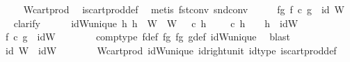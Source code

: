 \begin{isabellebody}
\ \ \ \ \isamarkupfalse%
\ W{\isacharprime}{\kern0pt}{\isacharunderscore}{\kern0pt}cart{\isacharunderscore}{\kern0pt}prod\ \isamarkupfalse%
\ is{\isacharunderscore}{\kern0pt}cart{\isacharunderscore}{\kern0pt}prod{\isacharunderscore}{\kern0pt}def\ \isamarkupfalse%
\ {\isacharparenleft}{\kern0pt}metis\ fst{\isacharunderscore}{\kern0pt}conv\ snd{\isacharunderscore}{\kern0pt}conv{\isacharparenright}{\kern0pt}\isanewline
\ \ \isamarkupfalse%
\ \isamarkupfalse%
\ fg{\isacharcolon}{\kern0pt}\ {\isachardoublequoteopen}f\ {\isasymcirc}\isactrlsub c\ g\ {\isacharequal}{\kern0pt}\ id\ W{\isacharprime}{\kern0pt}{\isachardoublequoteclose}\isanewline
\ \ \isamarkupfalse%
\ clarify\isanewline
\ \ \ \ \isamarkupfalse%
\ idW{\isacharprime}{\kern0pt}{\isacharunderscore}{\kern0pt}unique{\isacharcolon}{\kern0pt}\ {\isachardoublequoteopen}{\isasymforall}h{}{\isachardot}{\kern0pt}\ h{}\ {\isacharcolon}{\kern0pt}\ W{\isacharprime}{\kern0pt}\ {\isasymrightarrow}\ W{\isacharprime}{\kern0pt}\ {\isasymand}\ {\isasympi}{\isacharprime}{\kern0pt}\ {\isasymcirc}\isactrlsub c\ h{}\ {\isacharequal}{\kern0pt}\ {\isasympi}{\isacharprime}{\kern0pt}\ {\isasymand}\ {\isasympi}{\isacharprime}{\kern0pt}\ {\isasymcirc}\isactrlsub c\ h{}\ {\isacharequal}{\kern0pt}\ {\isasympi}{\isacharprime}{\kern0pt}\ {\isasymlongrightarrow}\ h{}\ {\isacharequal}{\kern0pt}\ idW{\isacharprime}{\kern0pt}{\isachardoublequoteclose}\isanewline
\ \ \ \ \isamarkupfalse%
\ {}{\isacharcolon}{\kern0pt}\ {\isachardoublequoteopen}f\ {\isasymcirc}\isactrlsub c\ g\ {\isacharequal}{\kern0pt}\ idW{\isacharprime}{\kern0pt}{\isachardoublequoteclose}\isanewline
\ \ \ \ \ \ \isamarkupfalse%
\ comp{\isacharunderscore}{\kern0pt}type\ f{\isacharunderscore}{\kern0pt}def\ fg{}\ fg{}\ g{\isacharunderscore}{\kern0pt}def\ idW{\isacharprime}{\kern0pt}{\isacharunderscore}{\kern0pt}unique\ \isamarkupfalse%
\ blast\isanewline
\ \ \ \ \isamarkupfalse%
\ {}{\isacharcolon}{\kern0pt}\ {\isachardoublequoteopen}id\ W{\isacharprime}{\kern0pt}\ {\isacharequal}{\kern0pt}\ idW{\isacharprime}{\kern0pt}{\isachardoublequoteclose}\isanewline
\ \ \ \ \ \ \isamarkupfalse%
\ W{\isacharprime}{\kern0pt}{\isacharunderscore}{\kern0pt}cart{\isacharunderscore}{\kern0pt}prod\ idW{\isacharprime}{\kern0pt}{\isacharunderscore}{\kern0pt}unique\ id{\isacharunderscore}{\kern0pt}right{\isacharunderscore}{\kern0pt}unit{}\ id{\isacharunderscore}{\kern0pt}type\ is{\isacharunderscore}{\kern0pt}cart{\isacharunderscore}{\kern0pt}prod{\isacharunderscore}{\kern0pt}def\ \isamarkupfalse%

\end{isabellebody}
